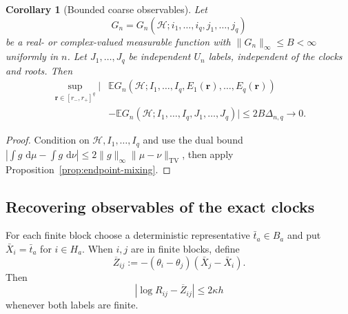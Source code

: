 \documentclass[11pt]{article}
\newcommand{\E}{\mathbb E}
\newcommand{\1}{\mathbf 1}
\newcommand{\TV}{\mathrm{TV}}
\newcommand{\cH}{\mathcal H}
\newcommand{\dd}{\,\mathrm d}
\newtheorem{corollary}[theorem]{Corollary}
\theoremstyle{definition}
\theoremstyle{remark}
\begin{document}
\begin{corollary}[Bounded coarse observables]
\label{cor:bounded-coarse-observables}
Let
\[
 G_n=G_n(\cH;i_1,\dots,i_q,j_1,\dots,j_q)
\]
be a real- or complex-valued measurable function with
$\|G_n\|_\infty\leq B<\infty$ uniformly in $n$.  Let
$J_1,\dots,J_q$ be independent $U_n$ labels, independent of the clocks
and roots.  Then
\begin{align}
 \sup_{\mathbf r\in[r_-,r_+]^q}
 \big|&\E G_n(\cH;I_1,\dots,I_q,E_1(\mathbf r),\dots,E_q(\mathbf r))
 \nonumber\\
 &-\E G_n(\cH;I_1,\dots,I_q,J_1,\dots,J_q)\big|
 \leq 2B\Delta_{n,q}\longrightarrow0. \label{eq:bounded-coarse-decorrelation}
\end{align}
\end{corollary}

\begin{proof}
Condition on $\cH,I_1,\dots,I_q$ and use the dual bound
$|\int g\,\dd\mu-\int g\,\dd\nu|\leq2\|g\|_\infty
\|\mu-\nu\|_{\TV}$, then apply Proposition~\ref{prop:endpoint-mixing}.
\end{proof}

\subsection{Recovering observables of the exact clocks}

For each finite block choose a deterministic representative
$\bar t_a\in B_a$ and put $\bar X_i=\bar t_a$ for $i\in H_a$.  When
$i,j$ are in finite blocks, define
\begin{equation}\label{eq:coarse-log-R}
 \overline Z_{ij}:=-(\theta_i-\theta_j)(\bar X_j-\bar X_i).
\end{equation}
Then
\begin{equation}\label{eq:coarse-log-R-error}
 |\log R_{ij}-\overline Z_{ij}|\leq2\kappa h
\end{equation}
whenever both labels are finite.
\end{document}
